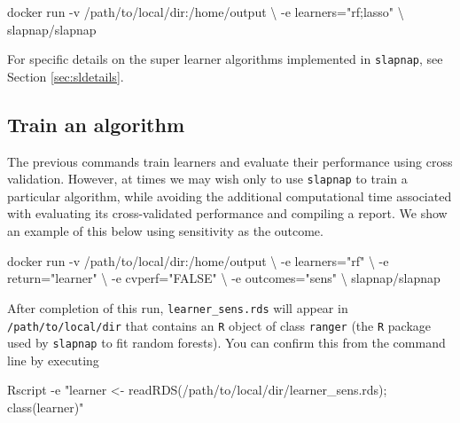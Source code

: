 \documentclass[
]{article}
\newenvironment{Shaded}{\begin{snugshade}}{\end{snugshade}}
\newcommand{\ExtensionTok}[1]{#1}
\newcommand{\NormalTok}[1]{#1}
\newcommand{\StringTok}[1]{\textcolor[rgb]{0.31,0.60,0.02}{#1}}
\begin{document}
\begin{Shaded}
\begin{Highlighting}[]
\ExtensionTok{docker}\NormalTok{ run {-}v /path/to/local/dir:/home/output \textbackslash{}}
\NormalTok{           {-}e learners=}\StringTok{"rf;lasso"}\NormalTok{ \textbackslash{}}
\NormalTok{           slapnap/slapnap}
\end{Highlighting}
\end{Shaded}

For specific details on the super learner algorithms implemented in \texttt{slapnap}, see Section \ref{sec:sldetails}.

\hypertarget{train-an-algorithm}{%
\subsection{Train an algorithm}\label{train-an-algorithm}}

The previous commands train learners and evaluate their performance using cross validation. However, at times we may wish only to use \texttt{slapnap} to train a particular algorithm, while avoiding the additional computational time associated with evaluating its cross-validated performance and compiling a report. We show an example of this below using sensitivity as the outcome.

\begin{Shaded}
\begin{Highlighting}[]
\ExtensionTok{docker}\NormalTok{ run {-}v /path/to/local/dir:/home/output \textbackslash{}}
\NormalTok{           {-}e learners=}\StringTok{"rf"}\NormalTok{ \textbackslash{}}
\NormalTok{           {-}e return=}\StringTok{"learner"}\NormalTok{ \textbackslash{}}
\NormalTok{           {-}e cvperf=}\StringTok{"FALSE"}\NormalTok{ \textbackslash{}}
\NormalTok{           {-}e outcomes=}\StringTok{"sens"}\NormalTok{ \textbackslash{}}
\NormalTok{           slapnap/slapnap}
\end{Highlighting}
\end{Shaded}

After completion of this run, \texttt{learner\_sens.rds} will appear in \texttt{/path/to/local/dir} that contains an \texttt{R} object of class \texttt{ranger} (the \texttt{R} package used by \texttt{slapnap} to fit random forests). You can confirm this from the command line by executing

\begin{Shaded}
\begin{Highlighting}[]
\ExtensionTok{Rscript}\NormalTok{ {-}e }\StringTok{"learner \textless{}{-} readRDS(\textquotesingle{}/path/to/local/dir/learner\_sens.rds\textquotesingle{}); class(learner)"}
\end{Highlighting}
\end{Shaded}
\end{document}
